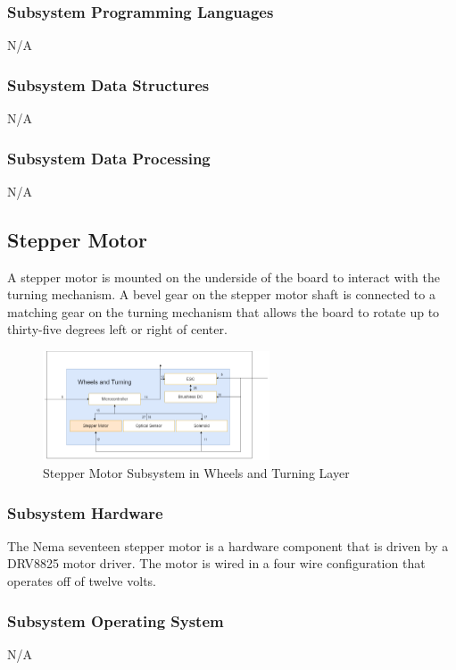 \subsubsection{Subsystem Programming Languages}
N/A

\subsubsection{Subsystem Data Structures}
N/A

\subsubsection{Subsystem Data Processing}
N/A

\subsection{Stepper Motor}
A stepper motor is mounted on the underside of the board to interact with the turning mechanism. A bevel gear on the stepper motor shaft is connected to a matching gear on the turning mechanism that allows the board to rotate up to thirty-five degrees left or right of center.

\begin{figure}[h!]
	\centering
 	\includegraphics[width=0.60\textwidth]{images/Keaton/Stepper.png}
 \caption{Stepper Motor Subsystem in Wheels and Turning Layer}
\end{figure}

\subsubsection{Subsystem Hardware}
The Nema seventeen stepper motor is a hardware component that is driven by a DRV8825 motor driver. The motor is wired in a four wire configuration that operates off of twelve volts.

\subsubsection{Subsystem Operating System}
N/A


